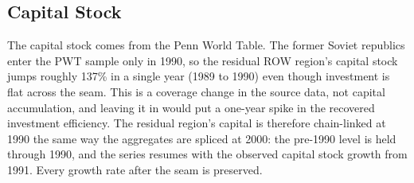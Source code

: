 \documentclass{article}
\begin{document}
\subsection*{Capital Stock}

The capital stock comes from the Penn World Table. The former Soviet republics enter the PWT sample
only in 1990, so the residual ROW region's capital stock jumps roughly 137\% in a single year (1989
to 1990) even though investment is flat across the seam. This is a coverage change in the source
data, not capital accumulation, and leaving it in would put a one-year spike in the recovered
investment efficiency. The residual region's capital is therefore chain-linked at 1990 the same way
the aggregates are spliced at 2000: the pre-1990 level is held through 1990, and the series resumes
with the observed capital stock growth from 1991. Every growth rate after the seam is preserved.
\end{document}
